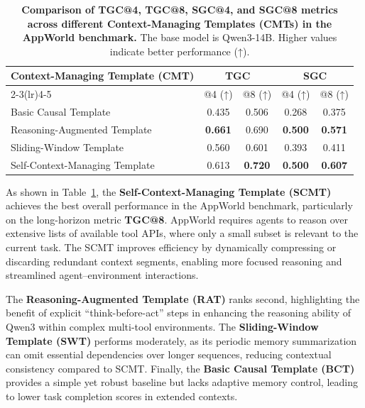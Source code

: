 \begin{table}[htbp]
\centering
\caption{
\textbf{Comparison of TGC@4, TGC@8, SGC@4, and SGC@8 metrics across different Context-Managing Templates (CMTs) in the AppWorld benchmark.} 
The base model is Qwen3-14B. 
Higher values indicate better performance (↑).
}
\label{tab:results-cmt}
\small
\setlength{\tabcolsep}{7pt}
\begin{tabular}{@{}l cc cc@{}}
\toprule
\textbf{Context-Managing Template (CMT)} &
\multicolumn{2}{c}{\textbf{TGC}} &
\multicolumn{2}{c}{\textbf{SGC}} \\
\cmidrule(lr){2-3}\cmidrule(lr){4-5}
 & @4 (↑) & @8 (↑) & @4 (↑) & @8 (↑) \\
\midrule
Basic Causal Template                      & 0.435          & 0.506             & 0.268             & 0.375 \\
Reasoning-Augmented Template               & \textbf{0.661} & 0.690             & \textbf{0.500}    & \textbf{0.571} \\
Sliding-Window Template                    & 0.560          & 0.601             & 0.393             & 0.411 \\
Self-Context-Managing Template             & 0.613          & \textbf{0.720}    & \textbf{0.500}    & \textbf{0.607} \\
\bottomrule
\end{tabular}
\end{table}

As shown in Table~\ref{tab:results-cmt}, the \textbf{Self-Context-Managing Template (SCMT)} achieves the best overall performance in the AppWorld benchmark, particularly on the long-horizon metric \textbf{TGC@8}. 
AppWorld requires agents to reason over extensive lists of available tool APIs, where only a small subset is relevant to the current task. 
The SCMT improves efficiency by dynamically compressing or discarding redundant context segments, enabling more focused reasoning and streamlined agent–environment interactions.

The \textbf{Reasoning-Augmented Template (RAT)} ranks second, highlighting the benefit of explicit ``think-before-act'' steps in enhancing the reasoning ability of Qwen3 within complex multi-tool environments. 
The \textbf{Sliding-Window Template (SWT)} performs moderately, as its periodic memory summarization can omit essential dependencies over longer sequences, reducing contextual consistency compared to SCMT. 
Finally, the \textbf{Basic Causal Template (BCT)} provides a simple yet robust baseline but lacks adaptive memory control, leading to lower task completion scores in extended contexts.

